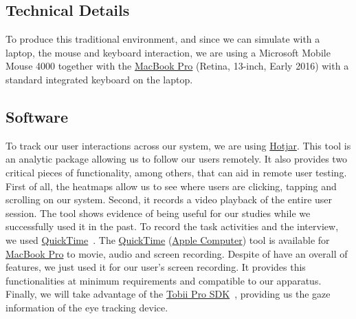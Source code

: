 \subsection{Technical Details}

To produce this traditional environment, and since we can simulate with a laptop, the mouse and keyboard interaction, we are using a Microsoft Mobile Mouse 4000 together with the \hyperlink{https://www.apple.com/shop/buy-mac/macbook-pro}{MacBook Pro} (Retina, 13-inch, Early 2016) with a standard integrated keyboard on the laptop.


\subsection{Software}

To track our user interactions across our system, we are using \hyperlink{https://www.hotjar.com/}{Hotjar}. This tool is an analytic package allowing us to follow our users remotely. It also provides two critical pieces of functionality, among others, that can aid in remote user testing. First of all, the heatmaps allow us to see where users are clicking, tapping and scrolling on our system. Second, it records a video playback of the entire user session. The tool shows evidence of being useful for our studies while we successfully used it in the past. To record the task activities and the interview, we used \hyperlink{https://support.apple.com/downloads/quicktime}{QuickTime}~\cite{rowell2006internet}. The \hyperlink{https://support.apple.com/downloads/quicktime}{QuickTime} (\hyperlink{https://www.apple.com/}{Apple Computer}) tool is available for \hyperlink{https://www.apple.com/shop/buy-mac/macbook-pro}{MacBook Pro} to movie, audio and screen recording. Despite of have an overall of features, we just used it for our user's screen recording. It provides this functionalities at minimum requirements and compatible to our apparatus. Finally, we will take advantage of the \hyperlink{https://www.tobiipro.com/product-listing/tobii-pro-sdk/}{Tobii Pro SDK}~\cite{chatelain2018evaluation}, providing us the gaze information of the eye tracking device.

\clearpage
